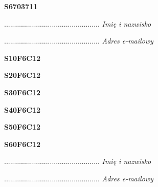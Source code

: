 \begin{turn}{90}\huge \textbf{S6703711}\end{turn}

\begin{turn}{90}\begin{minipage}{\linewidth} \vspace{20mm} ................................................  \textit{Imię i nazwisko}\end{minipage}\end{turn}

\begin{turn}{90}\begin{minipage}{\linewidth} \vspace{20mm} ................................................  \textit{Adres e-mailowy}\end{minipage}\end{turn}

\begin{turn}{90}\huge \textbf{S10F6C12}\end{turn}

\begin{turn}{90}\huge \textbf{S20F6C12}\end{turn}

\begin{turn}{90}\huge \textbf{S30F6C12}\end{turn}

\begin{turn}{90}\huge \textbf{S40F6C12}\end{turn}

\begin{turn}{90}\huge \textbf{S50F6C12}\end{turn}

\begin{turn}{90}\huge \textbf{S60F6C12}\end{turn}

\begin{turn}{90}\begin{minipage}{\linewidth} \vspace{20mm} ................................................  \textit{Imię i nazwisko}\end{minipage}\end{turn}

\begin{turn}{90}\begin{minipage}{\linewidth} \vspace{20mm} ................................................  \textit{Adres e-mailowy}\end{minipage}\end{turn}

